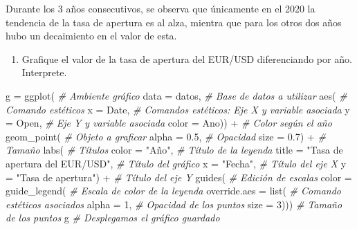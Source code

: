 \documentclass[
]{book}
\newenvironment{Shaded}{\begin{snugshade}}{\end{snugshade}}
\newcommand{\AttributeTok}[1]{\textcolor[rgb]{0.77,0.63,0.00}{#1}}
\newcommand{\CommentTok}[1]{\textcolor[rgb]{0.56,0.35,0.01}{\textit{#1}}}
\newcommand{\DecValTok}[1]{\textcolor[rgb]{0.00,0.00,0.81}{#1}}
\newcommand{\FloatTok}[1]{\textcolor[rgb]{0.00,0.00,0.81}{#1}}
\newcommand{\FunctionTok}[1]{\textcolor[rgb]{0.00,0.00,0.00}{#1}}
\newcommand{\NormalTok}[1]{#1}
\newcommand{\OtherTok}[1]{\textcolor[rgb]{0.56,0.35,0.01}{#1}}
\newcommand{\SpecialCharTok}[1]{\textcolor[rgb]{0.00,0.00,0.00}{#1}}
\newcommand{\StringTok}[1]{\textcolor[rgb]{0.31,0.60,0.02}{#1}}
\providecommand{\tightlist}{%
  \setlength{\itemsep}{0pt}\setlength{\parskip}{0pt}}
\begin{document}
Durante los 3 años consecutivos, se observa que únicamente en el 2020 la tendencia de la tasa de apertura es al alza, mientra que para los otros dos años hubo un decaimiento en el valor de esta.

\begin{enumerate}
\def\labelenumi{\arabic{enumi}.}
\setcounter{enumi}{3}
\tightlist
\item
  Grafique el valor de la tasa de apertura del EUR/USD diferenciando por año. Interprete.
\end{enumerate}

\begin{Shaded}
\begin{Highlighting}[]
\NormalTok{g }\OtherTok{=} \FunctionTok{ggplot}\NormalTok{( }\CommentTok{\# Ambiente gráfico}
  \AttributeTok{data =}\NormalTok{ datos, }\CommentTok{\# Base de datos a utilizar}
  \FunctionTok{aes}\NormalTok{( }\CommentTok{\# Comando estéticos}
    \AttributeTok{x =}\NormalTok{ Date, }\CommentTok{\# Comandos estéticos: Eje X y variable asociada}
    \AttributeTok{y =}\NormalTok{ Open, }\CommentTok{\# Eje Y y variable asociada}
    \AttributeTok{color =}\NormalTok{ Ano)) }\SpecialCharTok{+} \CommentTok{\# Color según el año}
  \FunctionTok{geom\_point}\NormalTok{( }\CommentTok{\# Objeto a graficar}
    \AttributeTok{alpha =} \FloatTok{0.5}\NormalTok{, }\CommentTok{\# Opacidad}
    \AttributeTok{size =} \FloatTok{0.7}\NormalTok{) }\SpecialCharTok{+} \CommentTok{\# Tamaño}
  \FunctionTok{labs}\NormalTok{( }\CommentTok{\# Títulos}
    \AttributeTok{color =} \StringTok{"Año"}\NormalTok{, }\CommentTok{\# Título de la leyenda}
    \AttributeTok{title =} \StringTok{"Tasa de apertura del EUR/USD"}\NormalTok{, }\CommentTok{\# Título del gráfico}
    \AttributeTok{x =} \StringTok{"Fecha"}\NormalTok{, }\CommentTok{\# Título del eje X}
    \AttributeTok{y =} \StringTok{"Tasa de apertura"}\NormalTok{) }\SpecialCharTok{+} \CommentTok{\# Título del eje Y}
  \FunctionTok{guides}\NormalTok{( }\CommentTok{\# Edición de escalas}
    \AttributeTok{color =} \FunctionTok{guide\_legend}\NormalTok{( }\CommentTok{\# Escala de color de la leyenda}
      \AttributeTok{override.aes =} \FunctionTok{list}\NormalTok{( }\CommentTok{\# Comando estéticos asociados}
        \AttributeTok{alpha =} \DecValTok{1}\NormalTok{, }\CommentTok{\# Opacidad de los puntos}
        \AttributeTok{size =} \DecValTok{3}\NormalTok{))) }\CommentTok{\# Tamaño de los puntos}
\NormalTok{g }\CommentTok{\# Desplegamos el gráfico guardado}
\end{Highlighting}
\end{Shaded}
\end{document}
